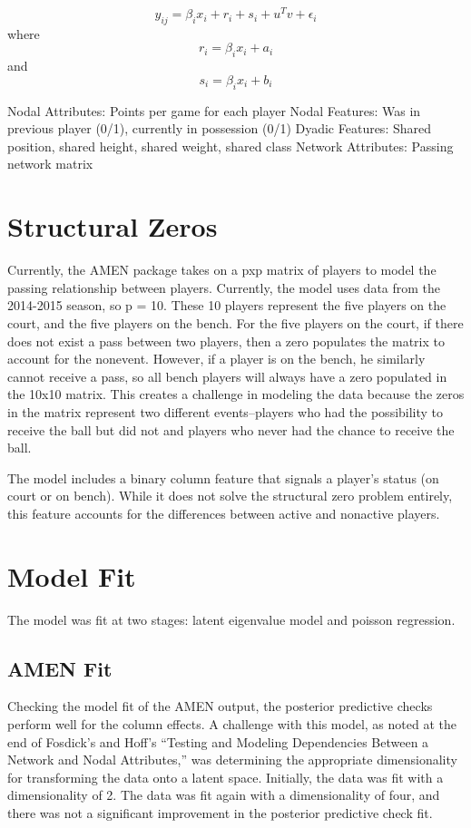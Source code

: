 \documentclass[12pt,twoside]{dukestatscithesis}
\theoremstyle{definition}
\theoremstyle{definition}
\theoremstyle{definition}
\theoremstyle{remark}
\begin{document}
\[y_{ij} =  \beta_{i}x_{i} + r_{i} + s_{i} + u^{T}v + \epsilon_{i}\]
where \[r_{i} = \beta_{i}x_{i} + a_{i}\] and
\[s_{i} = \beta_{i}x_{i} + b_{i}\]

Nodal Attributes: Points per game for each player Nodal Features: Was in
previous player (0/1), currently in possession (0/1) Dyadic Features:
Shared position, shared height, shared weight, shared class Network
Attributes: Passing network matrix

\section{Structural Zeros}\label{structural-zeros}

Currently, the AMEN package takes on a pxp matrix of players to model
the passing relationship between players. Currently, the model uses data
from the 2014-2015 season, so p = 10. These 10 players represent the
five players on the court, and the five players on the bench. For the
five players on the court, if there does not exist a pass between two
players, then a zero populates the matrix to account for the nonevent.
However, if a player is on the bench, he similarly cannot receive a
pass, so all bench players will always have a zero populated in the
10x10 matrix. This creates a challenge in modeling the data because the
zeros in the matrix represent two different events--players who had the
possibility to receive the ball but did not and players who never had
the chance to receive the ball.

The model includes a binary column feature that signals a player's
status (on court or on bench). While it does not solve the structural
zero problem entirely, this feature accounts for the differences between
active and nonactive players.

\section{Model Fit}\label{model-fit}

The model was fit at two stages: latent eigenvalue model and poisson
regression.

\subsection{AMEN Fit}\label{amen-fit}

Checking the model fit of the AMEN output, the posterior predictive
checks perform well for the column effects. A challenge with this model,
as noted at the end of Fosdick's and Hoff's ``Testing and Modeling
Dependencies Between a Network and Nodal Attributes,'' was determining
the appropriate dimensionality for transforming the data onto a latent
space. Initially, the data was fit with a dimensionality of 2. The data
was fit again with a dimensionality of four, and there was not a
significant improvement in the posterior predictive check fit.
\end{document}
